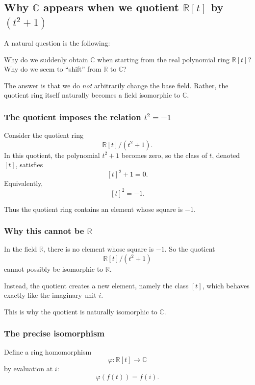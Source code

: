 \documentclass[12pt,a4paper]{article}
\theoremstyle{notespace}
\theoremstyle{definition}
\begin{document}
\subsection{Why \(\mathbb{C}\) appears when we quotient \(\mathbb{R}[t]\) by \((t^2+1)\)}

A natural question is the following:

\medskip

Why do we suddenly obtain \(\mathbb{C}\) when starting from the real polynomial ring \(\mathbb{R}[t]\)?  
Why do we seem to ``shift'' from \(\mathbb{R}\) to \(\mathbb{C}\)?

\medskip

The answer is that we do \emph{not} arbitrarily change the base field. Rather, the quotient ring itself naturally becomes a field isomorphic to \(\mathbb{C}\).

\subsubsection{The quotient imposes the relation \(t^2=-1\)}

Consider the quotient ring
\[
\mathbb{R}[t]/(t^2+1).
\]
In this quotient, the polynomial \(t^2+1\) becomes zero, so the class of \(t\), denoted \([t]\), satisfies
\[
[t]^2+1=0.
\]
Equivalently,
\[
[t]^2=-1.
\]

Thus the quotient ring contains an element whose square is \(-1\).

\subsubsection{Why this cannot be \(\mathbb{R}\)}

In the field \(\mathbb{R}\), there is no element whose square is \(-1\).  
So the quotient
\[
\mathbb{R}[t]/(t^2+1)
\]
cannot possibly be isomorphic to \(\mathbb{R}\).

Instead, the quotient creates a new element, namely the class \([t]\), which behaves exactly like the imaginary unit \(i\).

This is why the quotient is naturally isomorphic to \(\mathbb{C}\).

\subsubsection{The precise isomorphism}

Define a ring homomorphism
\[
\varphi:\mathbb{R}[t]\longrightarrow \mathbb{C}
\]
by evaluation at \(i\):
\[
\varphi(f(t))=f(i).
\]
\end{document}
